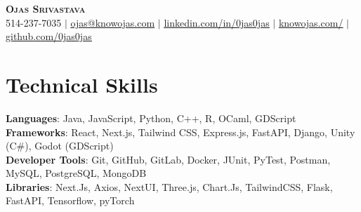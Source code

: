 \documentclass[letterpaper,11pt]{article}
\newcommand{\resumeSubHeadingListStart}{\begin{itemize}[leftmargin=0.15in, label={}]}
\newcommand{\resumeSubHeadingListEnd}{\end{itemize}}
\begin{document}

\begin{center}
    \textbf{\Huge \scshape Ojas Srivastava} \\ \vspace{1pt}
    \small 514-237-7035 $|$ \href{mailto:ojas@knowojas.com}{\underline{ojas@knowojas.com}} $|$ 
    \href{https://linkedin.com/in/0jas0jas}{\underline{linkedin.com/in/0jas0jas}} $|$
    \href{https://knowojas.com/}{\underline{knowojas.com/}} $|$
    \href{https://github.com/0jas0jas}{\underline{github.com/0jas0jas}}
\end{center}


\section{Technical Skills}
 \begin{itemize}[leftmargin=0.15in, label={}]
    \small{\item{
     \textbf{Languages}{: Java, JavaScript, Python, C++, R, OCaml, GDScript} \\
     \textbf{Frameworks}{: React, Next.js, Tailwind CSS, Express.js, FastAPI, Django, Unity (C\#), Godot (GDScript)} \\
     \textbf{Developer Tools}{: Git, GitHub, GitLab, Docker, JUnit, PyTest, Postman, MySQL, PostgreSQL, MongoDB} \\
     \textbf{Libraries}{: Next.Js, Axios, NextUI, Three.js, Chart.Js, TailwindCSS, Flask, FastAPI, Tensorflow, pyTorch}
    }}
 \end{itemize}
\end{document}
